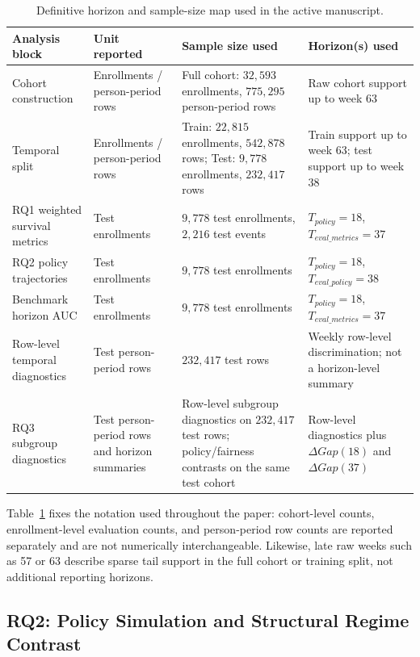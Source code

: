 \begin{table}[!t]
\centering
\footnotesize
\renewcommand{\arraystretch}{1.05}
\caption{Definitive horizon and sample-size map used in the active manuscript.}
\label{tab:definitive_horizon_sample_map}
\begin{tabular}{@{}p{} p{} p{} p{}@{}}
\hline
Analysis block & Unit reported & Sample size used & Horizon(s) used \\
\hline
Cohort construction & Enrollments / person-period rows & Full cohort: $32{,}593$ enrollments, $775{,}295$ person-period rows & Raw cohort support up to week 63 \\
Temporal split & Enrollments / person-period rows & Train: $22{,}815$ enrollments, $542{,}878$ rows; Test: $9{,}778$ enrollments, $232{,}417$ rows & Train support up to week 63; test support up to week 38 \\
RQ1 weighted survival metrics & Test enrollments & $9{,}778$ test enrollments, $2{,}216$ test events & $T_{policy}=18$, $T_{eval\_metrics}=37$ \\
RQ2 policy trajectories & Test enrollments & $9{,}778$ test enrollments & $T_{policy}=18$, $T_{eval\_policy}=38$ \\
Benchmark horizon AUC & Test enrollments & $9{,}778$ test enrollments & $T_{policy}=18$, $T_{eval\_metrics}=37$ \\
Row-level temporal diagnostics & Test person-period rows & $232{,}417$ test rows & Weekly row-level discrimination; not a horizon-level summary \\
RQ3 subgroup diagnostics & Test person-period rows and horizon summaries & Row-level subgroup diagnostics on $232{,}417$ test rows; policy/fairness contrasts on the same test cohort & Row-level diagnostics plus $\Delta Gap(18)$ and $\Delta Gap(37)$ \\
\hline
\end{tabular}
\end{table}

Table~\ref{tab:definitive_horizon_sample_map} fixes the notation used throughout the paper: cohort-level counts, enrollment-level evaluation counts, and person-period row counts are reported separately and are not numerically interchangeable. Likewise, late raw weeks such as 57 or 63 describe sparse tail support in the full cohort or training split, not additional reporting horizons.

\subsection{RQ2: Policy Simulation and Structural Regime Contrast}
\label{subsec:rq2_results}

